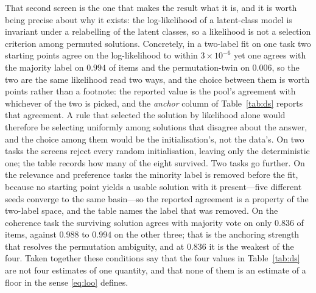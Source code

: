 \documentclass{article}
\begin{document}
That second screen is the one that makes the result what it is, and it is worth being precise about why it exists: the log-likelihood of a latent-class model is invariant under a relabelling of the latent classes, so a likelihood is not a selection criterion among permuted solutions. Concretely, in a two-label fit on one task two starting points agree on the log-likelihood to within $3\times 10^{-6}$ yet one agrees with the majority label on $0.994$ of items and the permutation-twin on $0.006$, so the two are the same likelihood read two ways, and the choice between them is worth points rather than a footnote: the reported value is the pool's agreement with whichever of the two is picked, and the \emph{anchor} column of Table~\ref{tab:ds} reports that agreement. A rule that selected the solution by likelihood alone would therefore be selecting uniformly among solutions that disagree about the answer, and the choice among them would be the initialisation's, not the data's. On two tasks the screens reject every random initialisation, leaving only the deterministic one; the table records how many of the eight survived. Two tasks go further. On the relevance and preference tasks the minority label is removed before the fit, because no starting point yields a usable solution with it present---five different seeds converge to the same basin---so the reported agreement is a property of the two-label space, and the table names the label that was removed. On the coherence task the surviving solution agrees with majority vote on only $0.836$ of items, against $0.988$ to $0.994$ on the other three; that is the anchoring strength that resolves the permutation ambiguity, and at $0.836$ it is the weakest of the four. Taken together these conditions say that the four values in Table~\ref{tab:ds} are not four estimates of one quantity, and that none of them is an estimate of a floor in the sense \eqref{eq:loo} defines. 
\end{document}
